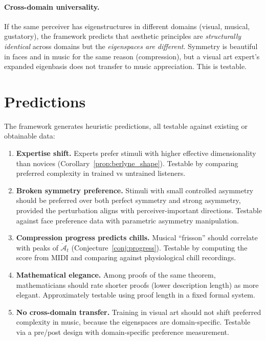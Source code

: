 \documentclass[journal]{IEEEtran}
\theoremstyle{definition}
\theoremstyle{remark}
\begin{document}
\paragraph{Cross-domain universality.}
If the same perceiver has eigenstructures in different
domains (visual, musical, gustatory), the framework predicts that
aesthetic principles are \emph{structurally identical} across
domains but the \emph{eigenspaces are different}.  Symmetry is
beautiful in faces and in music for the same reason (compression),
but a visual art expert's expanded eigenbasis does not transfer to
music appreciation.  This is testable.


\section{Predictions}
\label{sec:predictions}

The framework generates heuristic predictions, all testable against
existing or obtainable data:

\begin{enumerate}
    \item \textbf{Expertise shift.}  Experts prefer stimuli with
    higher effective dimensionality than novices
    (Corollary~\ref{prop:berlyne_shape}).  Testable by comparing
    preferred complexity in trained vs untrained listeners.

    \item \textbf{Broken symmetry preference.}  Stimuli with
    small controlled asymmetry should be preferred over both
    perfect symmetry and strong asymmetry, provided the
    perturbation aligns with perceiver-important directions.
    Testable against face preference data with parametric
    asymmetry manipulation.

    \item \textbf{Compression progress predicts chills.}
    Musical ``frisson'' should correlate with peaks of
    $\dot{\mathcal{A}}_t$ (Conjecture~\ref{conj:progress}).
    Testable by computing the score from MIDI and comparing
    against physiological chill recordings.

    \item \textbf{Mathematical elegance.}  Among proofs of the
    same theorem, mathematicians should rate shorter proofs (lower
    description length) as more elegant.  Approximately testable
    using proof length in a fixed formal system.

    \item \textbf{No cross-domain transfer.}  Training in visual
    art should not shift preferred complexity in music, because the
    eigenspaces are domain-specific.  Testable via a pre/post
    design with domain-specific preference measurement.
\end{enumerate}
\end{document}
